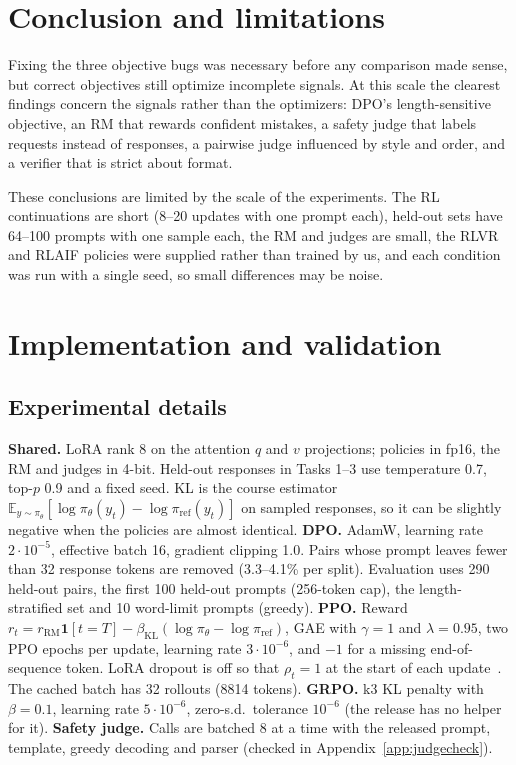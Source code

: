 \documentclass{article}
\begin{document}
\section{Conclusion and limitations}
Fixing the three objective bugs was necessary before any comparison made sense, but correct objectives still optimize incomplete signals. At this scale the clearest findings concern the signals rather than the optimizers: DPO's length-sensitive objective, an RM that rewards confident mistakes, a safety judge that labels requests instead of responses, a pairwise judge influenced by style and order, and a verifier that is strict about format.

These conclusions are limited by the scale of the experiments. The RL continuations are short (8--20 updates with one prompt each), held-out sets have 64--100 prompts with one sample each, the RM and judges are small, the RLVR and RLAIF policies were supplied rather than trained by us, and each condition was run with a single seed, so small differences may be noise.

\small



\normalsize
\appendix
{}
\section{Implementation and validation}
\label{app:impl}

\subsection{Experimental details}
\label{app:details}
\textbf{Shared.} LoRA rank 8 on the attention $q$ and $v$ projections; policies in fp16, the RM and judges in 4-bit. Held-out responses in Tasks 1--3 use temperature 0.7, top-$p$ 0.9 and a fixed seed. KL is the course estimator $\mathbb{E}_{y\sim\pi_\theta}[\log\pi_\theta(y_t)-\log\pi_{\text{ref}}(y_t)]$ on sampled responses, so it can be slightly negative when the policies are almost identical.
\textbf{DPO.} AdamW, learning rate $2\cdot10^{-5}$, effective batch 16, gradient clipping 1.0. Pairs whose prompt leaves fewer than 32 response tokens are removed (3.3--4.1\% per split). Evaluation uses 290 held-out pairs, the first 100 held-out prompts (256-token cap), the length-stratified set and 10 word-limit prompts (greedy).
\textbf{PPO.} Reward $r_t=r_{\text{RM}}\mathbf{1}[t{=}T]-\beta_{\text{KL}}(\log\pi_\theta-\log\pi_{\text{ref}})$, GAE with $\gamma=1$ and $\lambda=0.95$, two PPO epochs per update, learning rate $3\cdot10^{-6}$, and $-1$ for a missing end-of-sequence token. LoRA dropout is off so that $\rho_t=1$ at the start of each update~\cite{huang2024nplus}. The cached batch has 32 rollouts (8814 tokens).
\textbf{GRPO.} k3 KL penalty with $\beta=0.1$, learning rate $5\cdot10^{-6}$, zero-s.d.\ tolerance $10^{-6}$ (the release has no helper for it).
\textbf{Safety judge.} Calls are batched 8 at a time with the released prompt, template, greedy decoding and parser (checked in Appendix~\ref{app:judgecheck}).
\end{document}
